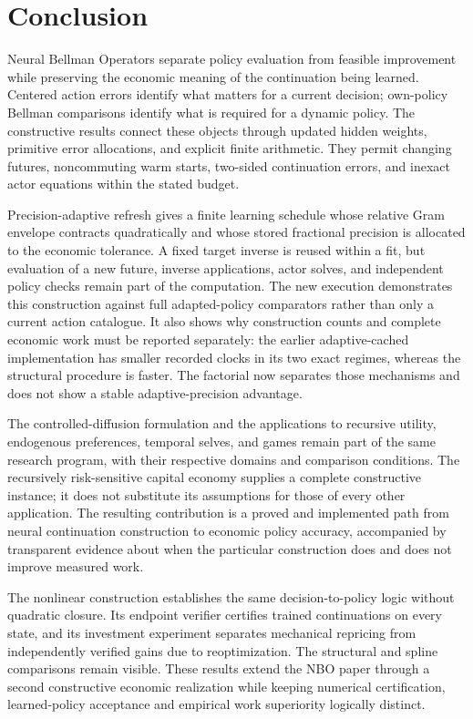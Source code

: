 \documentclass[ecta,nameyear,draft]{econsocart}
\theoremstyle{definition}
\theoremstyle{remark}
\begin{document}
\section{Conclusion}\label{sec:r37conclusion}
Neural Bellman Operators separate policy evaluation from feasible improvement
while preserving the economic meaning of the continuation being learned.
Centered action errors identify what matters for a current decision;
own-policy Bellman comparisons identify what is required for a dynamic
policy. The constructive results connect these objects through updated
hidden weights, primitive error allocations, and explicit finite arithmetic.
They permit changing futures, noncommuting warm starts, two-sided
continuation errors, and inexact actor equations within the stated budget.

Precision-adaptive refresh gives a finite learning schedule whose relative
Gram envelope contracts quadratically and whose stored fractional precision
is allocated to the economic tolerance. A fixed target inverse is reused
within a fit, but evaluation of a new future, inverse applications, actor
solves, and independent policy checks remain part of the computation. The
new execution demonstrates this construction against full adapted-policy
comparators rather than only a current action catalogue. It also shows why
construction counts and complete economic work must be reported separately:
the earlier adaptive-cached implementation has smaller recorded clocks in its two exact regimes, whereas the structural procedure is faster. The factorial now separates those mechanisms and does not show a stable adaptive-precision advantage.

The controlled-diffusion formulation and the applications to recursive
utility, endogenous preferences, temporal selves, and games remain part of
the same research program, with their respective domains and comparison
conditions. The recursively risk-sensitive capital economy supplies a
complete constructive instance; it does not substitute its assumptions for
those of every other application. The resulting contribution is a proved
and implemented path from neural continuation construction to economic
policy accuracy, accompanied by transparent evidence about when the
particular construction does and does not improve measured work.


The nonlinear construction establishes the same decision-to-policy logic without quadratic closure. Its endpoint verifier certifies trained continuations on every state, and its investment experiment separates mechanical repricing from independently verified gains due to reoptimization. The structural and spline comparisons remain visible. These results extend the NBO paper through a second constructive economic realization while keeping numerical certification, learned-policy acceptance and empirical work superiority logically distinct.



\end{document}
